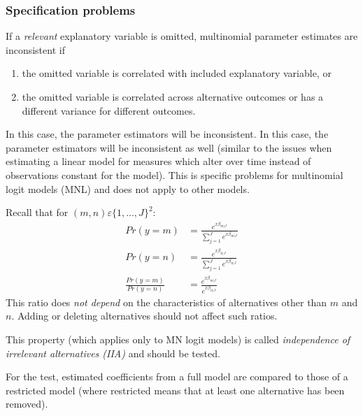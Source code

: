 		\subsubsection{Specification problems}\label{sec:specprob}	
				If a \textit{relevant} explanatory variable is omitted, multinomial parameter estimates are inconsistent if
				\begin{enumerate}
					\item the omitted variable is correlated with included explanatory variable, or
					\item the omitted variable is correlated across alternative outcomes or has a different variance for different outcomes.
				\end{enumerate} 
				In this case, the parameter estimators will be inconsistent.
				In this case, the parameter estimators will be inconsistent as well (similar to the issues when estimating a linear model for measures which alter over time instead of observations constant for the model).
				This is specific problems for multinomial logit models (MNL) and does not apply to other models.
				
				Recall that for $(m,n)\varepsilon\{1,...,J\}^2$:
				\begin{align*}
					Pr(y=m)&=\frac{e^{x\beta_{m|J}}}{\sum\limits^J_{j=1}e^{x\beta_{m|J}}}\\
					Pr(y=n)&=\frac{e^{x\beta_{n|J}}}{\sum\limits^J_{j=1}e^{x\beta_{n|J}}}\\					
					\frac{Pr(y=m)}{Pr(y=n)}&=\frac{e^{x\beta_{m|J}}}{e^{x\beta_{n|J}}}
				\end{align*}
				This ratio does \emph{not depend} on the characteristics of alternatives other than $m$ and $n$. Adding or deleting alternatives should not affect such ratios.
				
				This property (which applies only to MN logit models) is called \emph{independence of irrelevant alternatives (IIA)} and should be tested.
				
				For the test, estimated coefficients from a full model are compared to those of a restricted model (where restricted means that at least one alternative has been removed).
				
